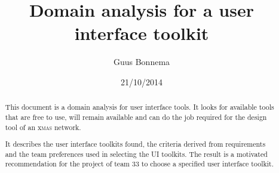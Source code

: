 \documentclass[a4paper,11pt,draft]{article}
\author{Guus Bonnema}
\date{21/10/2014}
\title{Domain analysis for a user interface toolkit}
\begin{document}

\newcommand{\xmas}{x\textsc{mas}}%
\newcommand{\ok}{$\checkmark$}

\newcommand{\mybox}[1]{\begin{boxedminipage}[t]{\textwidth}#1\end{boxedminipage}}


\newcommand\secformat[1]{%
    {\fontsize{60}{60}\selectfont\thesection}%
    \ifthenelse{\equal{\thesection}{}}{}{\quad\rule[-8pt]{2pt}{40pt}\quad}
    \parbox[b]{.7\textwidth}{\filright\bfseries #1}}%
\titleformat{\section}[block]
    {\filright\normalfont\sffamily}{}{0pt}{\secformat}
[1pc]

\maketitle

\begin{abstract}

	\noindent{} This document is a domain analysis for user interface tools. It
	looks for available tools that are free to use, will remain available and
	can do the job required for the design tool of an \xmas{} network. 

	\noindent{} It describes the user interface toolkits found, the criteria
	derived from requirements and the team preferences used in selecting the UI
	toolkits. The result is a motivated recommendation for the project of team
	33 to choose a specified user interface toolkit.  

\end{abstract}

\tableofcontents






\end{document}
